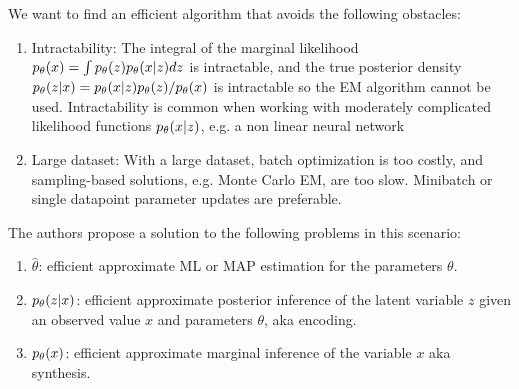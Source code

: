 \documentclass{article}
\begin{document}
We want to find an efficient algorithm that avoids the following obstacles:
\begin{enumerate}
    \item Intractability: The integral of the marginal likelihood $p_\theta(x) = \int p_\theta(z)p_\theta(x|z)dz$ is intractable, and the true posterior density $p_\theta(z|x) = p_\theta(x|z)p_\theta(z)/p_\theta(x)$ is intractable so the EM algorithm cannot be used. Intractability is common when working with moderately complicated likelihood functions $p_\theta(x|z)$, e.g. a non linear neural network 
    \item Large dataset: With a large dataset, batch optimization is too costly, and sampling-based solutions, e.g. Monte Carlo EM, are too slow. Minibatch or single datapoint parameter updates are preferable.
\end{enumerate}

The authors propose a solution to the following problems in this scenario:
\begin{enumerate}
    \item $\hat{\theta}$: efficient approximate ML or MAP estimation for the parameters $\theta$.
    \item $p_\theta(z|x)$: efficient approximate posterior inference of the latent variable $z$ given an observed value $x$ and parameters $\theta$, aka encoding.
    \item $p_\theta(x)$: efficient approximate marginal inference of the variable $x$ aka synthesis.
\end{enumerate}
\end{document}
